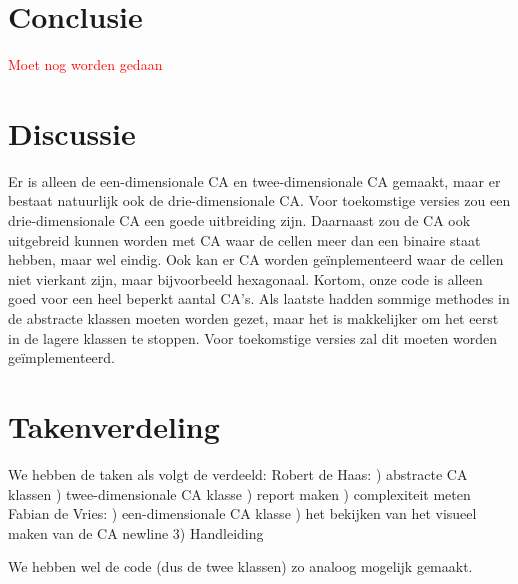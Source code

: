 \documentclass[12pt,a4paper]{article}
\begin{document}
\section*{Conclusie}
\textcolor{red}{Moet nog worden gedaan}

\section*{Discussie}
Er is alleen de een-dimensionale CA en twee-dimensionale 
CA gemaakt, maar er bestaat natuurlijk ook de drie-dimensionale CA.
Voor toekomstige versies zou een drie-dimensionale CA een goede uitbreiding zijn.
Daarnaast zou de CA ook uitgebreid kunnen worden met CA waar de cellen meer dan een binaire staat hebben, maar wel eindig.
Ook kan er CA worden geïnplementeerd waar de cellen niet vierkant zijn, maar bijvoorbeeld hexagonaal.
Kortom, onze code is alleen goed voor een heel beperkt aantal CA's.
Als laatste hadden sommige methodes in de abstracte klassen moeten worden gezet, maar het 
is makkelijker om het eerst in de lagere klassen te stoppen.
Voor toekomstige versies zal dit moeten worden geïmplementeerd.  

\newpage
\section*{Takenverdeling}
We hebben de taken als volgt de verdeeld:
\vspace{6pt}
\newline
Robert de Haas:
) abstracte CA klassen
) twee-dimensionale CA klasse
) report maken
) complexiteit meten
\vspace{6pt}
\newline
Fabian de Vries:
) een-dimensionale CA klasse
) het bekijken van het visueel maken van de CA
newline
3) Handleiding 


We hebben wel de code (dus de twee klassen) zo analoog mogelijk gemaakt.

  
\end{document}
